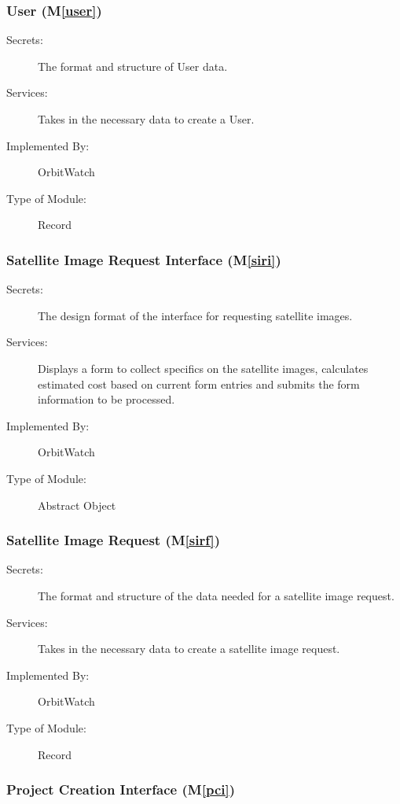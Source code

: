 \documentclass[12pt, titlepage]{article}
\newcommand{\mref}[1]{M\ref{#1}}
\begin{document}
\subsubsection{User (\mref{user})}

\begin{description}
\item[Secrets:]The format and structure of User data.
\item[Services:] Takes in the necessary data to create a User.
\item[Implemented By:] OrbitWatch
\item[Type of Module:] Record
\end{description}

\subsubsection{Satellite Image Request Interface (\mref{siri})}

\begin{description}
\item[Secrets:]The design format of the interface for requesting satellite images.
\item[Services:] Displays a form to collect specifics on the satellite images, calculates estimated cost based on current form entries and submits the form information to be processed.
\item[Implemented By:] OrbitWatch
\item[Type of Module:] Abstract Object
\end{description}

\subsubsection{Satellite Image Request (\mref{sirf})}

\begin{description}
\item[Secrets:]The format and structure of the data needed for a satellite image request.
\item[Services:] Takes in the necessary data to create a satellite image request.
\item[Implemented By:] OrbitWatch
\item[Type of Module:] Record
\end{description}

\subsubsection{Project Creation Interface (\mref{pci})}
\end{document}
